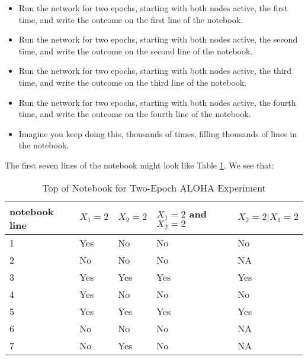 \begin{itemize}

\item Run the network for two epochs, starting with both nodes active,
the first time, and write the outcome on the first
line of the notebook.

\item Run the network for two epochs, starting with both nodes active,
the second time, and write the outcome on the second line of the
notebook.

\item Run the network for two epochs, starting with both nodes active,
the third time, and write the outcome on the third line of the notebook.

\item Run the network for two epochs, starting with both nodes active,
the fourth time, and write the outcome on the fourth line of the
notebook.

\item Imagine you keep doing this, thousands of times, filling
thousands of lines in the notebook.

\end{itemize} 

The first seven lines of the notebook might look like Table
\ref{alohanotebook}.  We see that:

\begin{table}
\begin{center}
\vskip 0.5in

\begin{tabular}{|l|l|l|l|l|}
\hline
notebook line & 
$X_1 = 2$ & 
$X_2 = 2$ & 
$X_1 = 2$ and $X_2 = 2$ & 
$X_2 = 2 | X_1 = 2$  \\ \hline 
\hline
1 & Yes & No & No & No \\ \hline 
2 & No & No & No & NA \\ \hline 
3 & Yes & Yes & Yes & Yes \\ \hline 
4 & Yes & No & No & No \\ \hline 
5 & Yes & Yes & Yes & Yes \\ \hline 
6 & No & No & No & NA \\ \hline 
7 & No & Yes & No & NA \\ \hline 
\end{tabular}

\end{center}
\caption{Top of Notebook for Two-Epoch ALOHA Experiment}
\label{alohanotebook}
\end{table}

